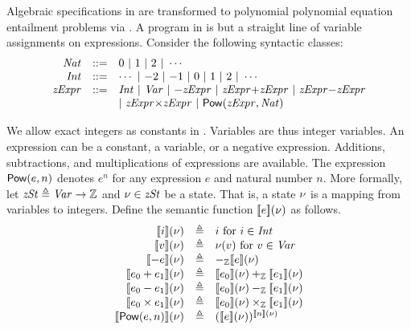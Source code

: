 Algebraic specifications in \bvdsl are transformed to polynomial polynomial equation entailment problems via \zdsl.
A program in \zdsl is but a straight line of variable assignments on expressions.
Consider the following syntactic classes:
\[
\begin{array}{rcl}
  \Nat & ::= & {0}\ |\ {1}\ |\ {2}\ |\ \cdots \\
  \Int & ::= & \cdots \ |\ {-2}\ |\ {-1} \ |\ 0\ |\ {1}\ |\ {2}\ |\ \cdots \\
  \zExpr & ::= & \Int \ |\ \Var \ |\  {-}\zExpr \ |\
                 \zExpr {+} \zExpr \ |\ \zExpr {-} \zExpr \\
  & & |\ \zExpr {\times} \zExpr  \ |\ \dslcode{Pow} (\zExpr, \Nat)
\end{array}
\]

We allow exact integers as constants in \zdsl.
Variables are thus integer variables. An expression can be a
constant, a variable, or a negative expression. Additions, subtractions,
and multiplications of expressions are available.
The expression $\mbox{\textsf{Pow}}(e, n)$ denotes $e^n$ for any expression $e$ and natural number $n$.
More formally, let $\mathit{zSt} \triangleq \mathit{Var} \rightarrow
\mathbb{Z}$ and $\nu \in \mathit{zSt}$ be a state. That is,
a {state} $\nu$ is a mapping from variables to integers. Define the
semantic function $[\![{e}]\!](\nu)$ as follows.
\[
\begin{array}{rcl}
  \valueof{{i}}(\zst) & \defn & i \textmd{  for ${i} \in \Int$} \\
  \valueof{{v}}(\zst) & \defn & \zst({v}) \textmd{  for ${v} \in \Var$} \\
  \valueof{-e}(\zst) & \defn & -_{\bbfZ}\valueof{e}(\zst) \\
  \valueof{e_0 + e_1}(\zst) & \defn & \valueof{e_0}(\zst) +_{\bbfZ} \valueof{e_1}(\zst) \\
  \valueof{e_0 - e_1}(\zst) & \defn & \valueof{e_0}(\zst) -_{\bbfZ} \valueof{e_1}(\zst) \\
  \valueof{e_0 \times e_1}(\zst) & \defn & \valueof{e_0}(\zst) \times_{\bbfZ} \valueof{e_1}(\zst) \\
  \valueof{\dslcode{Pow}(e, n)}(\zst) & \defn & (\valueof{e}(\zst))^{\valueof{n}(\zst)}
\end{array}
\]


